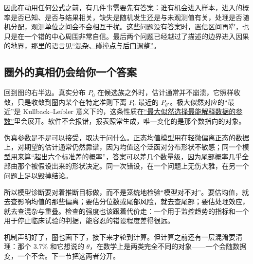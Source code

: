 因此在动用任何公式之前，有几件事需要先有答案：谁有机会进入样本，进入的概率是否已知、是否与结果相关，缺失是随机发生还是与未观测值有关，处理是否随机分配，观测单位之间会不会相互干扰。这些问题没有答案时，置信区间再窄，也只是在一个错的中心周围非常自信。最后两个问题已经越过了描述的边界进入因果的地界，那里的语言见\hyperref[sec:13-Machine-Learning/12-Causal-Inference/03]{``混杂、碰撞点与后门调整''}。

\subsection{圈外的真相仍会给你一个答案}

回到图的右半边。真实分布 \(P_0\) 在候选族之外时，估计通常并不崩溃，它照样收敛，只是收敛到圈内某个在特定准则下离 \(P_0\) 最近的 \(P_{\theta^\star}\)。极大似然对应的``最近''是 Kullback--Leibler 意义下的，这条性质在\hyperref[sec:11-Mathematical-Statistics/02-Point-Estimation/03]{``最大似然选择最能解释数据的参数''}里会展开。软件不会报错，报表照常生成，唯一变化的是那个数指向的对象。

伪真参数是不是可以接受，取决于问什么。正态均值模型用在轻微偏离正态的数据上，对期望的估计通常仍然靠谱，因为均值这个泛函对分布形状不敏感；同一个模型用来算``超出六个标准差的概率''，答案可以差几个数量级，因为尾部概率几乎全部由那个被假设出来的形状决定。同一次错设，在一个问题上无伤大雅，在另一个问题上足以毁掉结论。

所以模型诊断要对着推断目标做，而不是笼统地检验``模型对不对''。要估均值，就去查影响均值的那些偏离；要估分位数或尾部风险，就去查尾部；要估处理效应，就去查混杂与重叠。检查的强度也该跟着代价走：一个用于监控趋势的指标和一个用于停止临床试验的判据，能容忍的错设程度差得很远。

机制声明好了，圈也画下了，接下来才轮到计算。但计算之前还有一层混淆要清理：那个 \(3.7\%\) 和它想说的 \(\theta\)，在数学上是两类完全不同的对象——一个会随数据变，一个不会。下一节把这两者分开。
